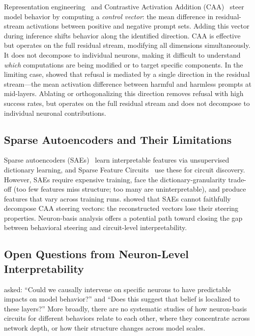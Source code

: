 \documentclass[11pt]{article}
\begin{document}
Representation engineering~\citep{zou2023representation} and Contrastive Activation Addition (CAA)~\citep{rimsky2024steering} steer model behavior by computing a \emph{control vector}: the mean difference in residual-stream activations between positive and negative prompt sets.
Adding this vector during inference shifts behavior along the identified direction.
CAA is effective but operates on the full residual stream, modifying all dimensions simultaneously.
It does not decompose to individual neurons, making it difficult to understand \emph{which} computations are being modified or to target specific components.
In the limiting case, \citet{arditi2024refusal} showed that refusal is mediated by a single direction in the residual stream---the mean activation difference between harmful and harmless prompts at mid-layers.
Ablating or orthogonalizing this direction removes refusal with high success rates, but operates on the full residual stream and does not decompose to individual neuronal contributions.

\subsection{Sparse Autoencoders and Their Limitations}
\label{sec:bg_sae}

Sparse autoencoders (SAEs)~\citep{cunningham2023sae, bricken2023monosemanticity, templeton2024scaling} learn interpretable features via unsupervised dictionary learning, and Sparse Feature Circuits~\citep{marks2024sparse} use these for circuit discovery.
However, SAEs require expensive training, face the dictionary-granularity trade-off (too few features miss structure; too many are uninterpretable), and produce features that vary across training runs.
\citet{mayne2024sae_steering} showed that SAEs cannot faithfully decompose CAA steering vectors: the reconstructed vectors lose their steering properties.
Neuron-basis analysis offers a potential path toward closing the gap between behavioral steering and circuit-level interpretability.

\subsection{Open Questions from Neuron-Level Interpretability}
\label{sec:bg_open}

\citet{chalnick2025goodfire} asked: ``Could we causally intervene on specific neurons to have predictable impacts on model behavior?'' and ``Does this suggest that belief is localized to these layers?''
More broadly, there are no systematic studies of how neuron-basis circuits for different behaviors relate to each other, where they concentrate across network depth, or how their structure changes across model scales.
\end{document}
